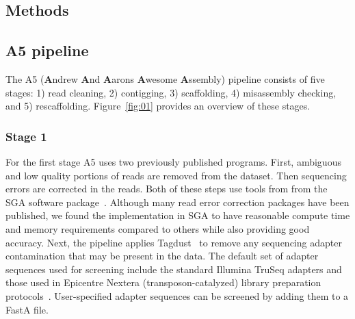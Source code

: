 \documentclass{bioinfo}
\begin{document}
\begin{methods}
\section{Methods}

\subsection{A5 pipeline}

The A5 (\textbf{A}ndrew \textbf{A}nd \textbf{A}arons \textbf{A}wesome \textbf{A}ssembly) pipeline consists of five 
stages: 1) read cleaning, 2) contigging, 3) scaffolding, 4) misassembly checking, and 5) rescaffolding. 
Figure~\ref{fig:01} provides an overview of these stages. 

\subsubsection{Stage 1}
For the first stage A5 uses two previously published programs. First, 
ambiguous and low quality portions of reads are removed from the dataset. Then sequencing errors are corrected in the reads. Both of these 
steps use tools from from the SGA software package~\citep{Simpson2010}.  Although many read error correction packages have been published,
we found the implementation in SGA to have reasonable compute time and memory requirements compared to others while also providing 
good accuracy.  Next, the pipeline applies Tagdust~\citep{Lassmann2009} to remove any 
sequencing adapter contamination that may be present in the data. The default set of adapter sequences used for screening
include the standard Illumina TruSeq adapters and those used in Epicentre Nextera (transposon-catalyzed) library preparation protocols~\citep{Adey2010}. 
User-specified adapter sequences can be screened by adding them to a FastA file. 


\end{methods}
\end{document}
